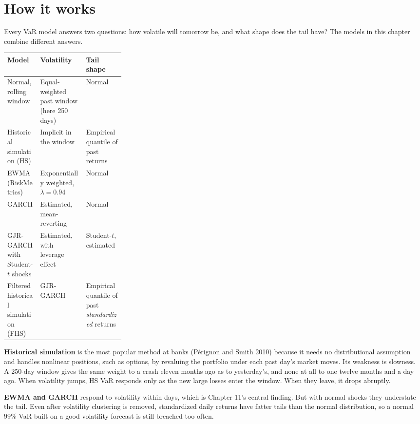 \section{How it works}
\label{sec:13-how}

Every VaR model answers two questions: how volatile will tomorrow be, and what shape does the tail have? The models in this chapter combine different answers.

\begin{center}
\small
\begin{tabularx}{0.9\linewidth}{@{}>{\raggedright\arraybackslash}p{0.28\linewidth}>{\raggedright\arraybackslash}X>{\raggedright\arraybackslash}X@{}}
\toprule
Model & Volatility & Tail shape \\
\midrule
Normal, rolling window & Equal-weighted past window (here 250 days) & Normal \\
Historical simulation (HS) & Implicit in the window & Empirical quantile of past returns \\
EWMA (RiskMetrics) & Exponentially weighted, $\lambda = 0.94$ & Normal \\
GARCH & Estimated, mean-reverting & Normal \\
GJR-GARCH with Student-$t$ shocks & Estimated, with leverage effect & Student-$t$, estimated \\
Filtered historical simulation (FHS) & GJR-GARCH & Empirical quantile of past \emph{standardized} returns \\
\bottomrule
\end{tabularx}
\end{center}

\textbf{Historical simulation} is the most popular method at banks (P\'erignon and Smith 2010) because it needs no distributional assumption and handles nonlinear positions, such as options, by revaluing the portfolio under each past day's market moves. Its weakness is slowness. A 250-day window gives the same weight to a crash eleven months ago as to yesterday's, and none at all to one twelve months and a day ago. When volatility jumps, HS VaR responds only as the new large losses enter the window. When they leave, it drops abruptly.

\textbf{EWMA and GARCH} respond to volatility within days, which is Chapter 11's central finding. But with normal shocks they understate the tail. Even after volatility clustering is removed, standardized daily returns have fatter tails than the normal distribution, so a normal 99\% VaR built on a good volatility forecast is still breached too often.

